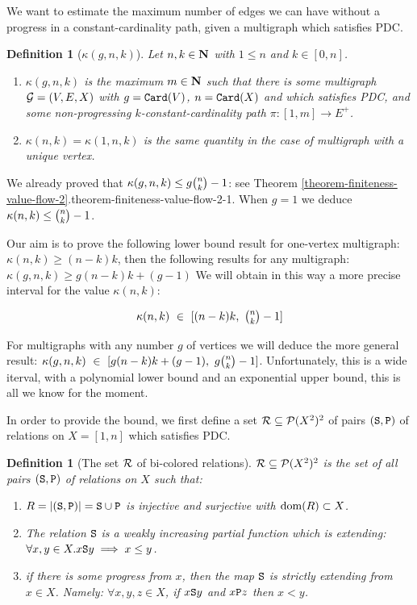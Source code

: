 \documentclass{lmcs}
\newtheorem{definition}[theorem]{Definition}
\begin{document}
We want to estimate the maximum number of edges
we can have without a progress in a constant-cardinality path, given a multigraph 
which satisfies PDC. 

\begin{definition}[$\kappa(g,n,k)$]
Let $n,k \in {\bf N}$ with $1 \le n$ and $k \in [0,n]$.

\begin{enumerate}
\item
$\kappa(g,n,k)$ is the maximum $m \in {\bf N}$ such that there is
some multigraph ${\mathcal G}=(V,E,X)$ with $g = {\tt Card}(V)$, $n={\tt Card}(X)$
and which satisfies PDC,
and some non-progressing $k$-constant-cardinality path $\pi:[1,m] \rightarrow E^+$.

\item
$\kappa(n,k) = \kappa(1,n,k)$ is the same quantity in the case of multigraph 
with a unique vertex.
\end{enumerate}
\end{definition}

We already proved that $\kappa(g,n,k) \le g  \newton{n}{k}-1$:
see Theorem 
\ref{theorem-finiteness-value-flow-2}.{theorem-finiteness-value-flow-2-1}.
When $g=1$ we deduce $\kappa(n,k) \le \newton{n}{k}-1$. 

Our aim is to prove the following lower bound result
for one-vertex multigraph: $\kappa(n,k) \ge (n-k)k$, then
the following results for any multigraph: $\kappa(g,n,k) \ge g(n-k)k + (g-1)$
We will obtain in this way a more precise interval for the value $\kappa(n,k)$:

$$
\kappa(n,k) \ \in \ [ (n-k)k,  \ \newton{n}{k}-1 ]
$$

For multigraphs with any number $g$ of vertices we will deduce the more general result:
$\kappa(g,n,k) \ \in \ [ g(n-k)k+(g-1),  \ g  \newton{n}{k}-1 ]$.
Unfortunately, this is a wide iterval, with a polynomial lower bound and an exponential 
upper bound, this is all we know for the moment.

In order to provide the bound, we first define a
set ${\mathcal R} \subseteq {\mathcal P}(X^2)^2$ of pairs $({\tt S},{\tt P})$ of relations on $X = [1,n]$
which satisfies PDC.

\begin{definition}[The set ${\mathcal R}$ of bi-colored relations]
${\mathcal R} \subseteq {\mathcal P}(X^2)^2$ is the set of all pairs $({\tt S},{\tt P})$ 
of relations on $X$ such that:
\begin{enumerate}
\item
$R = {| ({\tt S},{\tt P}) |} = {\tt S} \cup {\tt P}$ is injective and surjective
with ${\rm dom}(R) \subset X$.

\item
The relation ${\tt S}$ is a weakly increasing partial function which is extending:
$\forall x,y \in X. x {\tt S} y \implies x \le y$. 

\item
if there is some progress from $x$, then the map ${\tt S}$ is strictly extending from $x \in X$.
Namely: $\forall x,y,z \in X$, if $x {\tt S} y$ and $x {\tt P} z$ then $x < y$.
\end{enumerate}
\end{definition}
\end{document}
